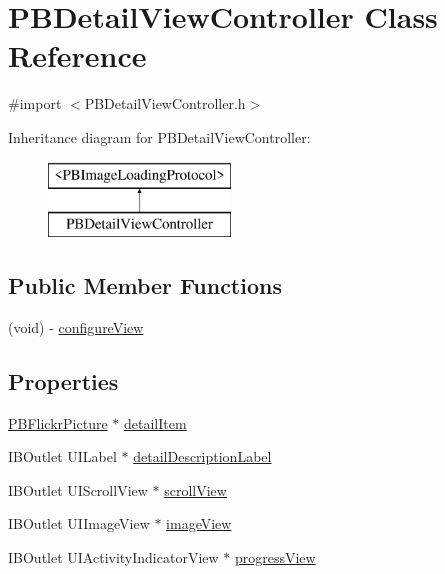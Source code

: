 \hypertarget{interface_p_b_detail_view_controller}{
\section{PBDetailViewController Class Reference}
\label{interface_p_b_detail_view_controller}
}


{\ttfamily \#import $<$PBDetailViewController.h$>$}

Inheritance diagram for PBDetailViewController:\begin{figure}[H]
\begin{center}
\leavevmode
\includegraphics[height=2cm]{interface_p_b_detail_view_controller}
\end{center}
\end{figure}
\subsection*{Public Member Functions}
\begin{DoxyCompactItemize}
\item 
(void) -\/ \hyperlink{interface_p_b_detail_view_controller_a6e444291096074b0a91839b7c0b2d78a}{configureView}
\end{DoxyCompactItemize}
\subsection*{Properties}
\begin{DoxyCompactItemize}
\item 
\hyperlink{interface_p_b_flickr_picture}{PBFlickrPicture} $\ast$ \hyperlink{interface_p_b_detail_view_controller_a0c5678bf65a5025c6f30ca0a7b5ce1e4}{detailItem}
\item 
IBOutlet UILabel $\ast$ \hyperlink{interface_p_b_detail_view_controller_a1504b315f71021c7e20ff327f03b4c62}{detailDescriptionLabel}
\item 
IBOutlet UIScrollView $\ast$ \hyperlink{interface_p_b_detail_view_controller_a74d6f6ed5cc6ccfdcffa8e1db3144010}{scrollView}
\item 
IBOutlet UIImageView $\ast$ \hyperlink{interface_p_b_detail_view_controller_adee2c301578c99fb57f38994799e641e}{imageView}
\item 
IBOutlet UIActivityIndicatorView $\ast$ \hyperlink{interface_p_b_detail_view_controller_ad38a6c45298415a486b74cf196bd0f9a}{progressView}
\end{DoxyCompactItemize}


